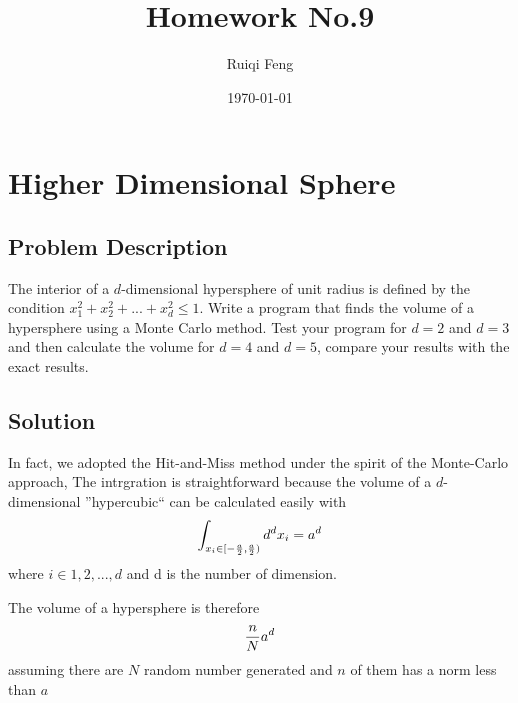\documentclass{article}
\title{Homework No.9}
\author{Ruiqi Feng}
\date{\today}
\begin{document}
\maketitle

\section{Higher Dimensional Sphere}
\subsection{Problem Description}
The interior of a $d$-dimensional hypersphere of unit radius is defined by the condition $x_1^2+x_2^2+...+x_d^2 \le 1$. Write a program that finds the volume of a hypersphere using a Monte Carlo method. Test your program for $d=2$ and $d=3$ and then calculate the volume for $d=4$ and $d=5$, compare your results with the exact results. 
\subsection{Solution}
In fact, we adopted the Hit-and-Miss method under the spirit of the Monte-Carlo approach, The intrgration is straightforward because the volume of a $d$-dimensional
”hypercubic“ can be calculated easily with
\begin{equation}
	\label{V_of_cubic}
	\int_{x_i\in [-{a\over 2}, {a\over 2})} d^d x_i = a^d
\end{equation}
where $i\in {1, 2, ..., d}$ and d is the number of dimension.\par
The volume of a hypersphere is therefore
\begin{equation}
	\label{V_of_sphere_MC}
	{n \over N}a^d
\end{equation}
assuming there are $N$ random number generated and $n$ of them has a norm less than $a$
\end{document}
